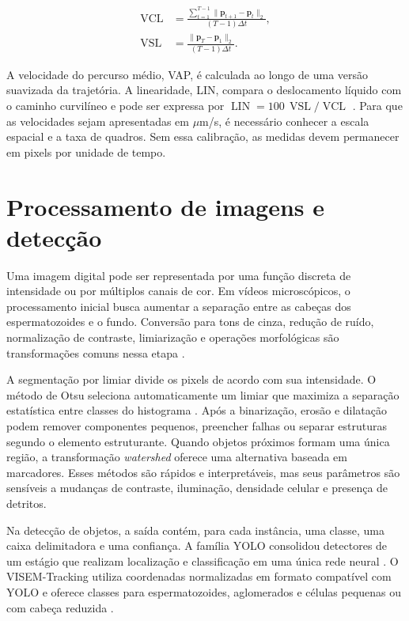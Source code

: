\begin{align}
	\operatorname{VCL} &=
	\frac{\sum_{t=1}^{T-1}\lVert \mathbf{p}_{t+1}-\mathbf{p}_t\rVert_2}
	{(T-1)\Delta t},\\
	\operatorname{VSL} &=
	\frac{\lVert \mathbf{p}_{T}-\mathbf{p}_1\rVert_2}
	{(T-1)\Delta t}.
\end{align}

A velocidade do percurso médio, \ac{VAP}, é calculada ao longo de uma versão suavizada da trajetória. A linearidade, \ac{LIN}, compara o deslocamento líquido com o caminho curvilíneo e pode ser expressa por $\operatorname{LIN}=100\,\operatorname{VSL}/\operatorname{VCL}$ \cite{who2021manual}. Para que as velocidades sejam apresentadas em $\mu$m/s, é necessário conhecer a escala espacial e a taxa de quadros. Sem essa calibração, as medidas devem permanecer em pixels por unidade de tempo.

\section{Processamento de imagens e detecção}

Uma imagem digital pode ser representada por uma função discreta de intensidade ou por múltiplos canais de cor. Em vídeos microscópicos, o processamento inicial busca aumentar a separação entre as cabeças dos espermatozoides e o fundo. Conversão para tons de cinza, redução de ruído, normalização de contraste, limiarização e operações morfológicas são transformações comuns nessa etapa \cite{szeliski2022computer}.

A segmentação por limiar divide os pixels de acordo com sua intensidade. O método de Otsu seleciona automaticamente um limiar que maximiza a separação estatística entre classes do histograma \cite{otsu1979threshold}. Após a binarização, erosão e dilatação podem remover componentes pequenos, preencher falhas ou separar estruturas segundo o elemento estruturante. Quando objetos próximos formam uma única região, a transformação \textit{watershed} oferece uma alternativa baseada em marcadores. Esses métodos são rápidos e interpretáveis, mas seus parâmetros são sensíveis a mudanças de contraste, iluminação, densidade celular e presença de detritos.

Na detecção de objetos, a saída contém, para cada instância, uma classe, uma caixa delimitadora e uma confiança. A família YOLO consolidou detectores de um estágio que realizam localização e classificação em uma única rede neural \cite{redmon2016yolo}. O VISEM-Tracking utiliza coordenadas normalizadas em formato compatível com YOLO e oferece classes para espermatozoides, aglomerados e células pequenas ou com cabeça reduzida \cite{thambawita2023visemtracking}.

